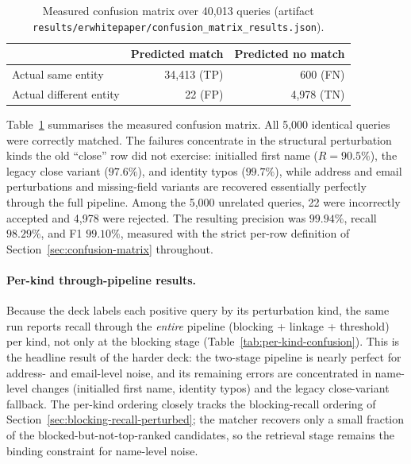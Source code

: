 \documentclass[11pt]{article}
\begin{document}
\begin{table}[h]
\centering
\caption{Measured confusion matrix over 40,013 queries (artifact \texttt{results/erwhitepaper/confusion\_matrix\_results.json}).}
\label{tab:confusion-matrix}
\begin{tabular}{lrr}
\toprule
 & Predicted match & Predicted no match \\
\midrule
Actual same entity & 34,413 (TP) & 600 (FN) \\
Actual different entity & 22 (FP) & 4,978 (TN) \\
\bottomrule
\end{tabular}
\end{table}

Table~\ref{tab:confusion-matrix} summarises the measured confusion matrix. All 5,000 identical queries were correctly matched. The failures concentrate in the structural perturbation kinds the old ``close'' row did not exercise: initialled first name ($R{=}90.5\%$), the legacy close variant ($97.6\%$), and identity typos ($99.7\%$), while address and email perturbations and missing-field variants are recovered essentially perfectly through the full pipeline. Among the 5,000 unrelated queries, 22 were incorrectly accepted and 4,978 were rejected. The resulting precision was $99.94\%$, recall $98.29\%$, and F1 $99.10\%$, measured with the strict per-row definition of Section~\ref{sec:confusion-matrix} throughout.

\paragraph{Per-kind through-pipeline results.} Because the deck labels each positive query by its perturbation kind, the same run reports recall through the \emph{entire} pipeline (blocking + linkage + threshold) per kind, not only at the blocking stage (Table~\ref{tab:per-kind-confusion}). This is the headline result of the harder deck: the two-stage pipeline is nearly perfect for address- and email-level noise, and its remaining errors are concentrated in name-level changes (initialled first name, identity typos) and the legacy close-variant fallback. The per-kind ordering closely tracks the blocking-recall ordering of Section~\ref{sec:blocking-recall-perturbed}; the matcher recovers only a small fraction of the blocked-but-not-top-ranked candidates, so the retrieval stage remains the binding constraint for name-level noise.
\end{document}
